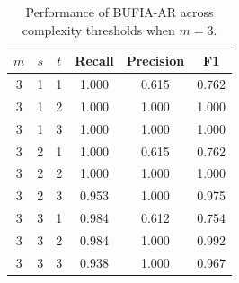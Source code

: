 \documentclass[11pt]{article}
\begin{document}
\begin{table}
\centering
\setlength{\tabcolsep}{6pt}
\begin{tabular}{cccccc}
\toprule
 $m$ & $s$ & $t$ & Recall & Precision & F1    \\
 \midrule
 3   & 1   & 1   & 1.000  & 0.615     & 0.762 \\
 3   & 1   & 2   & 1.000  & 1.000     & 1.000 \\
 3   & 1   & 3   & 1.000  & 1.000     & 1.000 \\
 3   & 2   & 1   & 1.000  & 0.615     & 0.762 \\
 3   & 2   & 2   & 1.000  & 1.000     & 1.000 \\
 3   & 2   & 3   & 0.953  & 1.000     & 0.975 \\
 3   & 3   & 1   & 0.984  & 0.612     & 0.754 \\
 3   & 3   & 2   & 0.984  & 1.000     & 0.992 \\
 3   & 3   & 3   & 0.938  & 1.000     & 0.967 \\
\bottomrule
\end{tabular}
\caption{Performance of BUFIA-AR across complexity thresholds when $m =3$.}
\label{tab:ar_grid}
\end{table}
\end{document}
